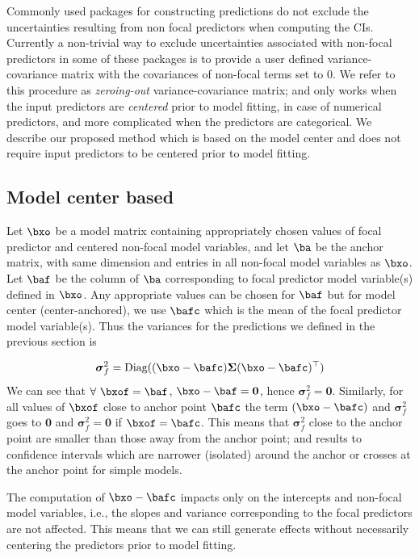 Commonly used  packages for constructing predictions do not exclude the uncertainties resulting from non focal predictors when computing the CIs. Currently a non-trivial way to exclude uncertainties associated with non-focal predictors in some of these packages is to provide a user defined variance-covariance matrix with the covariances of non-focal terms set to $0$. We refer to this procedure as \emph{zeroing-out} variance-covariance matrix; and only works when the input predictors are \emph{centered} prior to model fitting, in case of numerical predictors, and more complicated when the predictors are categorical. We describe our proposed method which is based on the model center and does not require input predictors to be centered prior to model fitting.


\subsection{Model center based}

Let $\bxo$ be a model matrix containing appropriately chosen values of focal predictor and centered non-focal model variables, and let $\ba$ be the anchor matrix, with same dimension and entries in all non-focal model variables as $\bxo$. Let $\baf$ be the column of $\ba$ corresponding to focal predictor model variable(s) defined in $\bxo$. Any appropriate values can be chosen for $\baf$ but for model center (center-anchored), we use $\bafc$ which is the mean of the focal predictor model variable(s). Thus the variances for the predictions we defined in the previous section is 

%
\begin{align}\label{eq:centered_variance}
\boldsymbol\sigma_f^2 = \textrm{Diag}((\bxo - \bafc) \boldsymbol{\Sigma} (\bxo - \bafc)^\top)
\end{align}
%
We can see that $\forall ~\bxof=\baf$, $\bxo - \baf = \boldsymbol 0$, hence $\boldsymbol\sigma_f^2 = \boldsymbol{0}$. Similarly, for all values of $\bxof$ close to anchor point $\bafc$ the term $(\bxo - \bafc)$ and $\boldsymbol\sigma_f^2$ goes to $\boldsymbol 0$ and $\boldsymbol\sigma_f^2 = \boldsymbol 0$ if $\bxof=\bafc$. This means that $\boldsymbol\sigma_f^2$ close to the anchor point are smaller than those away from the anchor point; and results to confidence intervals which are narrower (isolated) around the anchor or crosses at the anchor point for simple models.


The computation of $\bxo - \bafc$ impacts only on the intercepts and non-focal model variables, i.e., the slopes and variance corresponding to the focal predictors are not affected. This means that we can still generate effects without necessarily centering the predictors prior to model fitting.

